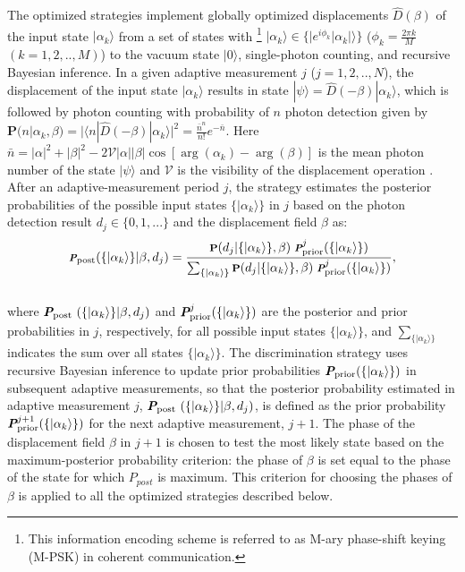 \documentclass[twocolumn,pra,preprintnumbers,amsmath,amssymb,superscriptaddress,floatfix]{revtex4}%
\begin{document}
The optimized strategies implement globally optimized displacements
$\hat{D}(\beta)$ of the input state $|\alpha_{k}\rangle$ from a set
of states with \footnote{This information encoding
scheme is referred to as M-ary phase-shift keying (M-PSK) in coherent communication.}
$|\alpha_{k}\rangle\in\{|e^{i\phi_{k}}|\alpha_{k}|\rangle\}$
($\phi_{k}=\frac{2\pi k}{M}$ $(k=1,2,..,M)$) to the vacuum state
$|0\rangle$, single-photon counting, and recursive Bayesian
inference. In a given adaptive measurement $j$ ($j=1,2,..,N$), the
displacement of the input state $|\alpha_k\rangle$ results in state
$|\psi\rangle=\hat{D}(-\beta)|\alpha_k\rangle$, which is followed by
photon counting with probability of $n$ photon detection given by
$\textbf{P}(n|\alpha_{k},\beta)=|\langle
n|\hat{D}(-\beta)|\alpha_{k}\rangle|^2= \frac{ \bar{n} ^{n}}{
n!}e^{-\bar{n}}$. Here $\bar{n}= |\alpha|^2 + |\beta|^2 -
2\mathcal{V}|\alpha||\beta| \cos[{\arg(\alpha_{k}) - \arg(\beta)}]$
is the mean photon number of the state $|\psi\rangle$ and
$\mathcal{V}$ is the visibility of the displacement operation
\cite{becerra13,becerra15}. After an adaptive-measurement period
$j$, the strategy estimates the posterior probabilities of the
possible input states $\{|\alpha_{k}\rangle\}$ in $j$ based on the
photon detection result $d_{j}\in\{0,1,...\}$ and the displacement
field $\beta$ as:
\begin{equation}
\footnotesize{
\emph{\textbf{P}}_{\textrm{post}}(\{|\alpha_{k}\rangle\}|\beta,d_{j})=
\frac{\textbf{P}(d_{j}|\{|\alpha_{k}\rangle\},
\beta)~\emph{\textbf{P}}^{j}_{\textrm{prior}}(\{|\alpha_{k}\rangle\})}{\sum_{\{|\alpha_{k}\rangle\}}\textbf{P}(d_{j}|\{|\alpha_{k}\rangle\},
\beta)~\emph{\textbf{P}}^{j}_{\textrm{prior}}(\{|\alpha_{k}\rangle\})},
}
\end{equation}
\\
where
$\emph{\textbf{P}}_{\textrm{post}}~(\{|\alpha_{k}\rangle\}|\beta,d_{j})$
and $\emph{\textbf{P}}^{j}_{\textrm{prior}}(\{|\alpha_{k}\rangle\})$
are the posterior and prior probabilities in $j$, respectively, for
all possible input states $\{|\alpha_{k}\rangle\}$, and
$\sum_{\{|\alpha_{k}\rangle\}}$ indicates the sum over all states
$\{|\alpha_{k}\rangle\}$. The discrimination strategy uses recursive
Bayesian inference to update prior probabilities
$\emph{\textbf{P}}_{\textrm{prior}}(\{|\alpha_{k}\rangle\})$ in
subsequent adaptive measurements, so that the posterior probability
estimated in adaptive measurement $j$,
$\emph{\textbf{P}}_{\textrm{post}}~(\{|\alpha_{k}\rangle\}|\beta,d_{j})$,
is defined as the  prior probability
$\emph{\textbf{P}}^{j+1}_{\textrm{prior}}(\{|\alpha_{k}\rangle\})$
for the next adaptive measurement, $j+1$. The phase of the
displacement field $\beta$ in $j+1$ is chosen to test the most
likely state based on the maximum-posterior probability criterion:
the phase of $\beta$ is set equal to the phase of the state for
which $P_{post}$ is maximum. This criterion for choosing the phases
of  $\beta$ is applied to all the optimized strategies described
below.
\end{document}
